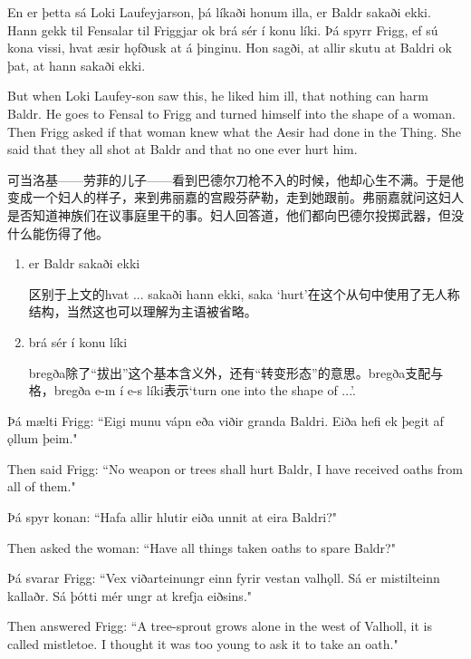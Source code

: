 \begin{paracol}{2}
  En er þetta sá Loki Laufeyjarson, þá líkaði honum illa, er Baldr sakaði ekki. Hann gekk til Fensalar til Friggjar ok brá sér í konu líki. Þá spyrr Frigg, ef sú kona vissi, hvat æsir hǫfðusk at á þinginu. Hon sagði, at allir skutu at Baldri ok þat, at hann sakaði ekki.

  \switchcolumn

  But when Loki Laufey-son saw this, he liked him ill, that nothing can harm Baldr. He goes to Fensal to Frigg and turned himself into the shape of a woman. Then Frigg asked if that woman knew what the Aesir had done in the Thing. She said that they all shot at Baldr and that no one ever hurt him.
\end{paracol}
\begin{translation*}{}
  可当洛基——劳菲的儿子——看到巴德尔刀枪不入的时候，他却心生不满。于是他变成一个妇人的样子，来到弗丽嘉的宫殿芬萨勒，走到她跟前。弗丽嘉就问这妇人是否知道神族们在议事庭里干的事。妇人回答道，他们都向巴德尔投掷武器，但没什么能伤得了他。
\end{translation*}
\begin{grammar*}{}
  \begin{enumerate}[leftmargin=*]
    \item er Baldr sakaði ekki

          区别于上文的hvat ... sakaði hann ekki, saka `hurt'在这个从句中使用了无人称结构，当然这也可以理解为主语被省略。

    \item brá sér í konu líki

          bregða除了“拔出”这个基本含义外，还有“转变形态”的意思。bregða支配与格，bregða e-m í e-s líki表示`turn one into the shape of ...'.
  \end{enumerate}
\end{grammar*}
\begin{paracol}{2}
  Þá mælti Frigg: ``Eigi munu vápn eða viðir granda Baldri. Eiða hefi ek þegit af ǫllum þeim."

  \switchcolumn

  Then said Frigg: ``No weapon or trees shall hurt Baldr, I have received oaths from all of them."

  \switchcolumn*

  Þá spyr konan: ``Hafa allir hlutir eiða unnit at eira Baldri?"

  \switchcolumn
  Then asked the woman: ``Have all things taken oaths to spare Baldr?"

  \switchcolumn*
  Þá svarar Frigg: ``Vex viðarteinungr einn fyrir vestan valhǫll. Sá er mistilteinn kallaðr. Sá þótti mér ungr at krefja eiðsins."

  \switchcolumn

  Then answered Frigg: ``A tree-sprout grows alone in the west of Valholl, it is called mistletoe. I thought it was too young to ask it to take an oath."
\end{paracol}
